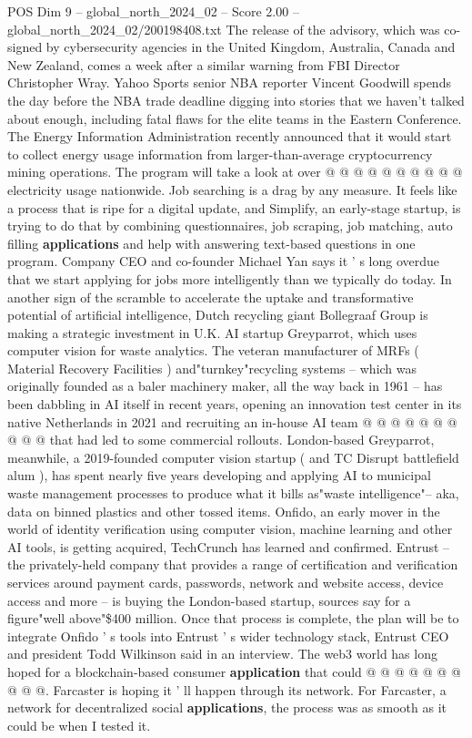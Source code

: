 \begin{textsample}{POS Dim 9 – global\_north\_2024\_02 – Score 2.00 – global\_north\_2024\_02/200198408.txt}
The release of the advisory, which was co-signed by cybersecurity agencies in the United Kingdom, Australia, Canada and New Zealand, comes a week after a similar warning from FBI Director Christopher Wray.
Yahoo Sports senior NBA reporter Vincent Goodwill spends the day before the NBA trade deadline digging into stories that we haven't talked about enough, including fatal flaws for the elite teams in the Eastern Conference.
The Energy Information Administration recently announced that it would start to collect energy usage information from larger-than-average cryptocurrency mining operations.
The program will take a look at over @ @ @ @ @ @ @ @ @ @ electricity usage nationwide.
Job searching is a drag by any measure.
It feels like a process that is ripe for a digital update, and Simplify, an early-stage startup, is trying to do that by combining questionnaires, job scraping, job matching, auto filling \textbf{applications} and help with answering text-based questions in one program.
Company CEO and co-founder Michael Yan says it ' s long overdue that we start applying for jobs more intelligently than we typically do today.
In another sign of the scramble to accelerate the uptake and transformative potential of artificial intelligence, Dutch recycling giant Bollegraaf Group is making a strategic investment in U.K.
AI startup Greyparrot, which uses computer vision for waste analytics.
The veteran manufacturer of MRFs ( Material Recovery Facilities ) and"turnkey"recycling systems -- which was originally founded as a baler machinery maker, all the way back in 1961 -- has been dabbling in AI itself in recent years, opening an innovation test center in its native Netherlands in 2021 and recruiting an in-house AI team @ @ @ @ @ @ @ @ @ @ that had led to some commercial rollouts.
London-based Greyparrot, meanwhile, a 2019-founded computer vision startup ( and TC Disrupt battlefield alum ), has spent nearly five years developing and applying AI to municipal waste management processes to produce what it bills as"waste intelligence"-- aka, data on binned plastics and other tossed items.
Onfido, an early mover in the world of identity verification using computer vision, machine learning and other AI tools, is getting acquired, TechCrunch has learned and confirmed.
Entrust -- the privately-held company that provides a range of certification and verification services around payment cards, passwords, network and website access, device access and more -- is buying the London-based startup, sources say for a figure"well above"\$400 million.
Once that process is complete, the plan will be to integrate Onfido ' s tools into Entrust ' s wider technology stack, Entrust CEO and president Todd Wilkinson said in an interview.
The web3 world has long hoped for a blockchain-based consumer \textbf{application} that could @ @ @ @ @ @ @ @ @ @.
Farcaster is hoping it ' ll happen through its network.
For Farcaster, a network for decentralized social \textbf{applications}, the process was as smooth as it could be when I tested it.

\end{textsample}
